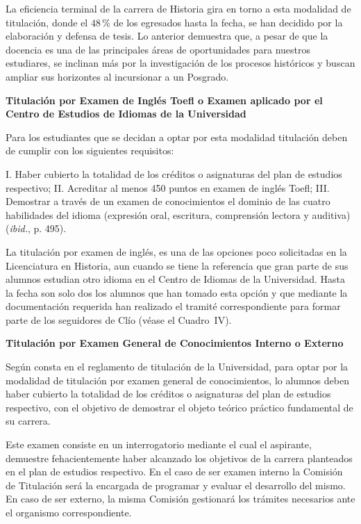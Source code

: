La eficiencia terminal de la carrera de Historia gira en torno a esta
modalidad de titulación, donde el 48\,\% de los egresados hasta la fecha, se
han decidido por la elaboración y defensa de tesis. Lo anterior demuestra
que, a pesar de que la docencia es una  de las principales áreas de
oportunidades para nuestros estudiares, se inclinan más por la
investigación de los procesos históricos y buscan ampliar sus horizontes al
incursionar a un Posgrado.


\medskip
\begin{sloppypar}
\textbf{Titulación por Examen de In\-glés Toefl o Exa\-men apli\-cado por el
Cen\-tro de Es\-tu\-dios de Idiomas de la Universidad}
\end{sloppypar}

Para los estudiantes que se decidan a optar por esta modalidad titulación
deben de cumplir con los siguientes requisitos:


I. Haber cubierto la totalidad de los créditos o asignaturas del plan de
estudios respectivo; II. Acreditar al menos 450 puntos en examen de inglés
Toefl; III. Demostrar a través de un examen de conocimientos el dominio de
las cuatro habilidades del idioma (expresión oral, escritura, comprensión
lectora y auditiva) (\textit{ibid.}, p. 495).


La titulación por examen de inglés, es una de las opciones poco solicitadas
en la Licenciatura en Historia, aun cuando se tiene la referencia que gran
parte de sus alumnos estudian otro idioma en el Centro de Idiomas de la
Universidad. Hasta la fecha son solo dos los alumnos que han tomado esta
opción y que mediante la documentación requerida han realizado el tramité
correspondiente para formar parte de los seguidores de Clío (véase el Cuadro~IV).

\textbf{Titulación por Examen General de Conocimientos Interno o Externo}
\enlargethispage{1\baselineskip}

\medskip
Según consta en el reglamento de titulación de la Universidad, para optar
por la modalidad de titulación por examen general de conocimientos, lo
alumnos deben haber cubierto la totalidad de los créditos o asignaturas del
plan de estudios respectivo, con el objetivo de demostrar el objeto teórico
práctico fundamental de su carrera.

Este examen consiste en un interrogatorio mediante el cual el aspirante,
demuestre fehacientemente  haber alcanzado los objetivos de la carrera
planteados en el plan de estudios respectivo. En el caso de ser examen
interno la Comisión de Titulación será la encargada de programar y evaluar
el desarrollo del mismo. En caso de ser externo, la misma Comisión
gestionará los trámites necesarios ante el organismo correspondiente.


